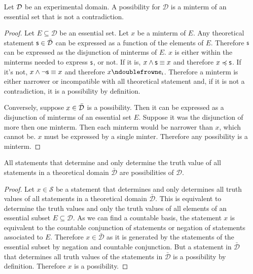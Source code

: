 \documentclass[11pt,letterpaper,fleqn]{memoir} %
\begin{document}
\begin{mathSection}
	
\begin{prop}
	Let $\mathcal{D}$ be an experimental domain. A possibility for $\mathcal{D}$ is a minterm of an essential set that is not a contradiction.
\end{prop}

\begin{proof}
	Let $E \subseteq \mathcal{D}$ be an essential set. Let $x$ be a minterm of $E$. Any theoretical statement $\mathsf{s} \in \bar{\mathcal{D}}$ can be expressed as a function of the elements of $E$. Therefore $\mathsf{s}$ can be expressed as the disjunction of minterms of $E$. $x$ is either within the minterms needed to express $\mathsf{s}$, or not. If it is, $x \wedge \mathsf{s} \equiv x$ and therefore $x \preccurlyeq \mathsf{s}$. If it's not, $x \wedge \neg \mathsf{s} \equiv x$ and therefore $x \ncomp \obs[e]_i$. Therefore a minterm is either narrower or incompatible with all theoretical statement and, if it is not a contradiction, it is a possibility by definition.
	
	Conversely, suppose $x \in \bar{\mathcal{D}}$ is a possibility. Then it can be expressed as a disjunction of minterms of an essential set $E$. Suppose it was the disjunction of more then one minterm. Then each minterm would be narrower than $x$, which cannot be. $x$ must be expressed by a single minter. Therefore any possibility is a minterm.
\end{proof}

\begin{prop}
	All statements that determine and only determine the truth value of all statements in a theoretical domain $\bar{\mathcal{D}}$ are possibilities of $\mathcal{D}$.
\end{prop}

\begin{proof}
	Let $x \in \mathcal{S}$ be a statement that determines and only determines all truth values of all statements in a theoretical domain $\bar{\mathcal{D}}$. This is equivalent to determine the truth values and only the truth values of all elements of an essential subset $E \subseteq \mathcal{D}$. As we can find a countable basis, the statement $x$ is equivalent to the countable conjunction of statements or negation of statements associated to $E$. Therefore $x \in \bar{\mathcal{D}}$ as it is generated by the statements of the essential subset by negation and countable conjunction. But a statement in $\bar{\mathcal{D}}$ that determines all truth values of the statements in $\bar{\mathcal{D}}$ is a possibility by definition. Therefore $x$ is a possibility.
\end{proof}
\end{mathSection}
\end{document}
